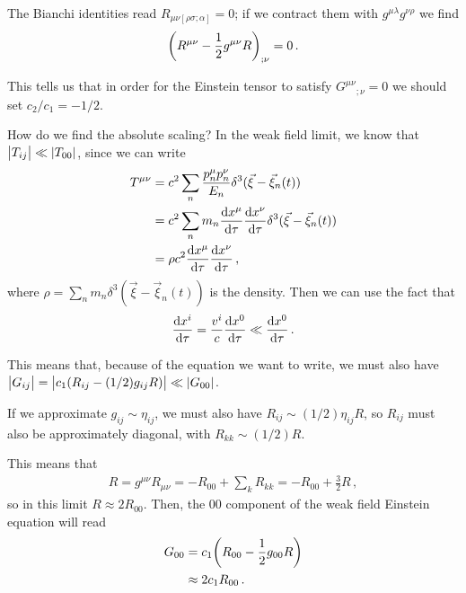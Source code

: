 \documentclass[main.tex]{subfiles}
\begin{document}

The Bianchi identities read \(R_{\mu \nu [\rho \sigma ; \alpha ]} = 0\); if we contract them with \(g^{\mu \lambda } g^{\nu \rho }\) we find 
%
\begin{align}
\qty(R^{\mu \nu } - \frac{1}{2} g^{\mu \nu } R)_{; \nu } = 0
\,.
\end{align}

This tells us that in order for the Einstein tensor to satisfy \(G^{\mu \nu }{}_{; \nu } = 0\) we should set \(c_2 / c_1 = - 1/2\). 

How do we find the absolute scaling? 
In the weak field limit, we know that \(\abs{T_{ij}} \ll \abs{T_{00} }\), since we can write 
%
\begin{align}
T^{\mu \nu } &= c^2 \sum _{n} \frac{p^{\mu }_{n} p^{\nu }_{n}}{E_n} \delta^3(\vec{\xi} - \vec{\xi}_n(t))  \\
&= c^2 \sum _{n} m_n \dv{x^{\mu }}{\tau } \dv{x^{\nu }}{\tau } \delta^3(\vec{\xi} - \vec{\xi}_n(t))  \\
&= \rho c^2 \dv{x^{\mu }}{\tau } \dv{x^{\nu }}{\tau }
\,,
\end{align}
%
where \(\rho = \sum _{n} m_n \delta^3 (\vec{\xi} - \vec{\xi}_n (t))\) is the density. 
Then we can use the fact that 
%
\begin{align}
\dv{x^{i}}{\tau } =  \frac{v^{i}}{c} \dv{x^{0}}{\tau } \ll \dv{x^{0}}{\tau }
\,.
\end{align}

This means that, because of the equation we want to write, we must also have \(\abs{G_{ij}} = \abs{c_1 (R_{ij} - (1/2) g_{ij} R)} \ll \abs{G_{00} }\). 

If we approximate \(g_{ij} \sim \eta_{ij}\), we must also have \(R_{ij} \sim (1/2) \eta_{ij} R\), so \(R_{ij}\) must also be approximately diagonal, with \(R_{kk} \sim (1/2) R\). 

This means that 
%
\begin{align}
R = g^{\mu \nu }R_{\mu \nu } = - R_{00} + \sum _{k} R_{kk } = - R_{00} + \frac{3}{2} R
\,,
\end{align}
%
so in this limit \(R \approx 2 R_{00} \). 
Then, the 00 component of the weak field Einstein equation will read 
%
\begin{align}
G_{00} &= c_1 \qty(R_{00} - \frac{1}{2} g_{00} R)  \\
&\approx 2 c_1 R_{00}  
\,.
\end{align}
\end{document}
